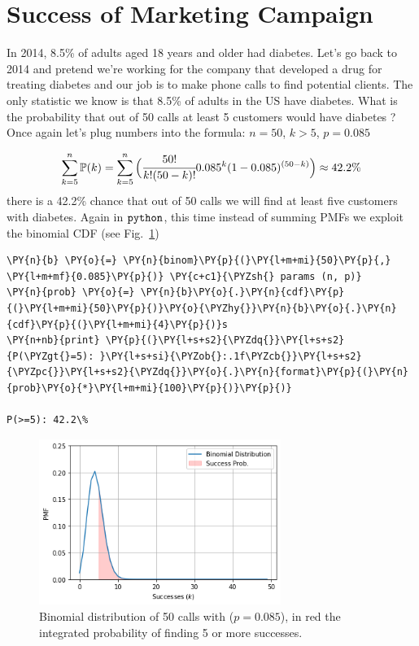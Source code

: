 \section{Success of Marketing Campaign}\label{success-of-marketing-campaign}

In 2014, 8.5\% of adults aged 18 years and older had diabetes. Let's go
back to 2014 and pretend we're working for the company that developed a
drug for treating diabetes and our job is to make phone calls to find
potential clients. The only statistic we know is that 8.5\% of adults in
the US have diabetes. What is the probability that out of 50 calls at
least 5 customers would have diabetes ? Once again let's plug numbers
into the formula: \(n = 50\), \(k > 5\), \(p = 0.085\)

\[\sum_{k=5}^{n}\mathbb{P}(k) = \sum_{k=5}^{n}\Big(\cfrac{50!}{k!(50 - k)!}0.085^{k}(1-0.085)^{(50-k)}\Big) \approx 42.2\% \]
there is a 42.2\% chance that out of 50 calls we will find at least five
customers with diabetes. Again in \(\tt{python}\), this time instead of
summing PMFs we exploit the binomial CDF (see Fig.~\ref{fig:binomial_cdf})

\begin{tcolorbox}[breakable, size=fbox, boxrule=1pt, pad at break*=1mm,colback=cellbackground, colframe=cellborder]
\begin{Verbatim}[commandchars=\\\{\}]
\PY{n}{b} \PY{o}{=} \PY{n}{binom}\PY{p}{(}\PY{l+m+mi}{50}\PY{p}{,} \PY{l+m+mf}{0.085}\PY{p}{)} \PY{c+c1}{\PYZsh{} params (n, p)}
\PY{n}{prob} \PY{o}{=} \PY{n}{b}\PY{o}{.}\PY{n}{cdf}\PY{p}{(}\PY{l+m+mi}{50}\PY{p}{)}\PY{o}{\PYZhy{}}\PY{n}{b}\PY{o}{.}\PY{n}{cdf}\PY{p}{(}\PY{l+m+mi}{4}\PY{p}{)}s
\PY{n+nb}{print} \PY{p}{(}\PY{l+s+s2}{\PYZdq{}}\PY{l+s+s2}{P(\PYZgt{}=5): }\PY{l+s+si}{\PYZob{}:.1f\PYZcb{}}\PY{l+s+s2}{\PYZpc{}}\PY{l+s+s2}{\PYZdq{}}\PY{o}{.}\PY{n}{format}\PY{p}{(}\PY{n}{prob}\PY{o}{*}\PY{l+m+mi}{100}\PY{p}{)}\PY{p}{)}

P(>=5): 42.2\%
\end{Verbatim}
\end{tcolorbox}

    \begin{figure}[htb]
    \centering
    \includegraphics[width=0.7\textwidth]{figures/binomial_5_0.png}
    \caption{Binomial distribution of 50 calls with ($p=0.085$), in red the integrated probability of finding 5 or more successes.}
    \label{fig:binomial_cdf}
    \end{figure}
    